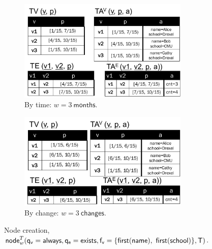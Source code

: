 \begin{figure}[t]
\begin{subfigure}[b]{0.5\textwidth}
\includegraphics[width=3.2in]{figs/agg1.pdf}
\caption{By time: $w=3~\textsf{months}$.}
\label{fig:tg_agg1}
\vspace{-0.2cm}
\end{subfigure}
\begin{subfigure}[b]{0.5\textwidth}
\includegraphics[width=3.2in]{figs/agg2.pdf}
\caption{By change: $w=3~\textsf{changes}$.}
\label{fig:tg_agg2}
\end{subfigure}
\caption[]{Node creation,
  $\textsf{node}^T_w(\mathsf{q_v=always},\mathsf{q_e=exists,f_v=\{first(name),~first(school)\}},\mathsf{T})$.}
\vspace{-0.2cm}
\label{fig:tg_agg}
\vspace{-0.2cm}
\end{figure}

